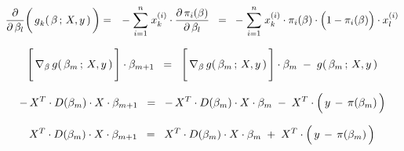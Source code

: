\begin{eqnarray*}
\dfrac{\partial}{\partial\,\beta_{l}}\!\left(\,\overset{{\color{white}\vert}}{g}_{k}(\,\beta\,;\,X,y\,)\,\right)
& = &
	-\;\overset{n}{\underset{i=1}{\sum}}\;x^{(i)}_{k}\cdot\dfrac{\partial\,\pi_{i}(\beta)}{\partial\,\beta_{l}}
\;\; = \;\;
	-\;\overset{n}{\underset{i=1}{\sum}}\;x^{(i)}_{k}\cdot
	\pi_{i}(\beta)
	\cdot
	\left(1\overset{{\color{white}.}}{-}\pi_{i}(\beta)\right)
	\cdot
	x^{(i)}_{l}
\end{eqnarray*}

\vskip 0.5cm

\begin{equation*}
\left[\,\overset{{\color{white}\vert}}{\nabla}_{\beta}\,g(\,\beta_{m}\,;\,X,y\,)\,\right] \cdot \beta_{m+1}
\;\; = \;\;
	\left[\,\overset{{\color{white}\vert}}{\nabla}_{\beta}\,g(\,\beta_{m}\,;\,X,y\,)\,\right] \cdot \beta_{m}
	\; - \;
	g(\,\beta_{m}\,;\,X,y\,)
\end{equation*}

\begin{equation*}
-\,X^{T} \cdot D(\beta_{m}) \cdot X \cdot \beta_{m+1}
\;\; = \;\;
	-\,X^{T} \cdot D(\beta_{m}) \cdot X \cdot \beta_{m}
	\; - \;
	X^{T} \cdot \left(\,y \,\overset{{\color{white}.}}{-}\, \pi(\beta_{m})\,\right)
\end{equation*}

\begin{equation*}
X^{T} \cdot D(\beta_{m}) \cdot X \cdot \beta_{m+1}
\;\; = \;\;
	X^{T} \cdot D(\beta_{m}) \cdot X \cdot \beta_{m}
	\; + \;
	X^{T} \cdot \left(\,y \,\overset{{\color{white}.}}{-}\, \pi(\beta_{m})\,\right)
\end{equation*}



\renewcommand{\theenumi}{\roman{enumi}}
\renewcommand{\labelenumi}{\textnormal{(\theenumi)}$\;\;$}

